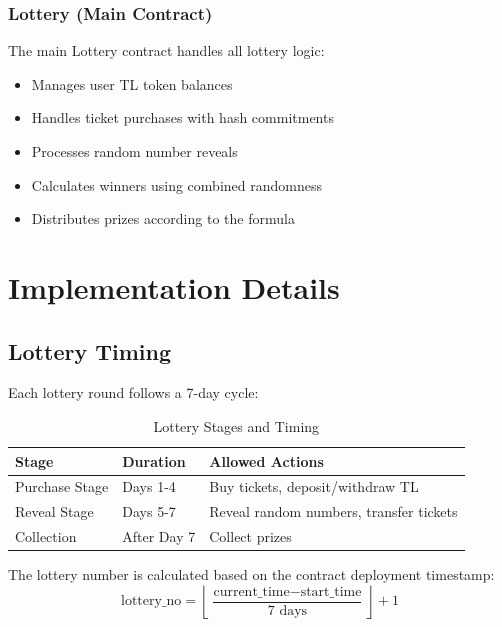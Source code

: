 \documentclass[12pt,a4paper]{article}
\begin{document}
\subsubsection{Lottery (Main Contract)}

The main Lottery contract handles all lottery logic:
\begin{itemize}
    \item Manages user TL token balances
    \item Handles ticket purchases with hash commitments
    \item Processes random number reveals
    \item Calculates winners using combined randomness
    \item Distributes prizes according to the formula
\end{itemize}

\section{Implementation Details}

\subsection{Lottery Timing}

Each lottery round follows a 7-day cycle:

\begin{table}[H]
    \centering
    \begin{tabular}{@{}lll@{}}
        \toprule
        \textbf{Stage} & \textbf{Duration} & \textbf{Allowed Actions} \\
        \midrule
        Purchase Stage & Days 1-4 & Buy tickets, deposit/withdraw TL \\
        Reveal Stage & Days 5-7 & Reveal random numbers, transfer tickets \\
        Collection & After Day 7 & Collect prizes \\
        \bottomrule
    \end{tabular}
    \caption{Lottery Stages and Timing}
    \label{tab:timing}
\end{table}

The lottery number is calculated based on the contract deployment timestamp:
\begin{equation}
    \text{lottery\_no} = \left\lfloor \frac{\text{current\_time} - \text{start\_time}}{7 \text{ days}} \right\rfloor + 1
\end{equation}
\end{document}
